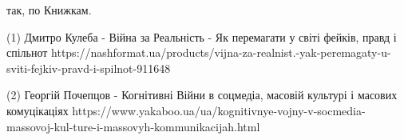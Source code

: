  
 
 
 
 
















так, по Книжкам. 

(1) Дмитро Кулеба - Війна за Реальність - Як перемагати у світі фейків, правд і спільнот
https://nashformat.ua/products/vijna-za-realnist.-yak-peremagaty-u-sviti-fejkiv-pravd-i-spilnot-911648

(2) Георгій Почепцов - Когнітивні Війни в соцмедіа, масовій культурі і масових комуцікаціях 
https://www.yakaboo.ua/ua/kognitivnye-vojny-v-socmedia-massovoj-kul-ture-i-massovyh-kommunikacijah.html

